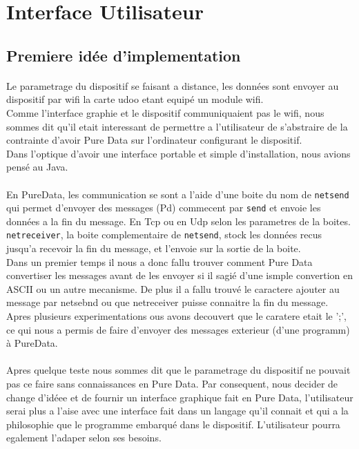 \documentclass[a4paper, titlepage, oneside, 12pt]{article}%
\begin{document}
\newpage
\section{Interface Utilisateur}
\subsection{Premiere idée d'implementation}
\paragraph{}
Le parametrage du dispositif se faisant a distance, les données sont envoyer au dispositif par wifi la carte udoo etant equipé un module wifi.\\
Comme l'interface graphie et le dispositif communiquaient pas le wifi, nous sommes dit qu'il etait interessant de permettre a l'utilisateur de s'abstraire de la contrainte d'avoir Pure Data sur l'ordinateur configurant le dispositif. \\
Dans l'optique d'avoir une interface portable et simple d'installation, nous avions pensé au Java.
\paragraph{}
En PureData, les communication se sont a l'aide d'une boite du nom de \texttt{netsend} qui permet d'envoyer des messages (Pd) commecent par \texttt{send} et envoie les données a la fin du message. En Tcp ou en Udp selon les parametres de la boites.\\
\texttt{netreceiver}, la boite complementaire de \texttt{netsend}, stock les données recus jusqu'a recevoir la fin du message, et l'envoie sur la sortie de la boite.\\
Dans un premier temps il nous a donc fallu trouver comment Pure Data convertiser les messages avant de les envoyer si il sagié d'une ismple convertion en ASCII ou un autre  mecanisme. De plus il a fallu trouvé le caractere ajouter au message par netsebnd ou que netreceiver puisse connaitre la fin du message.\\
Apres plusieurs experimentations ous avons decouvert que le caratere etait le ';', ce qui nous a permis de faire d'envoyer des messages exterieur (d'une programm) à PureData.

\paragraph{}
Apres quelque teste nous sommes dit que le parametrage du dispositif ne pouvait pas ce faire sans connaissances en Pure Data. Par consequent, nous decider de change d'idéee et de fournir un interface graphique fait en Pure Data, l'utilisateur serai plus a l'aise avec une interface fait dans un langage qu'il connait et qui a la philosophie que le programme embarqué dans le dispositif. L'utilisateur pourra egalement l'adaper selon ses besoins.
\end{document}
